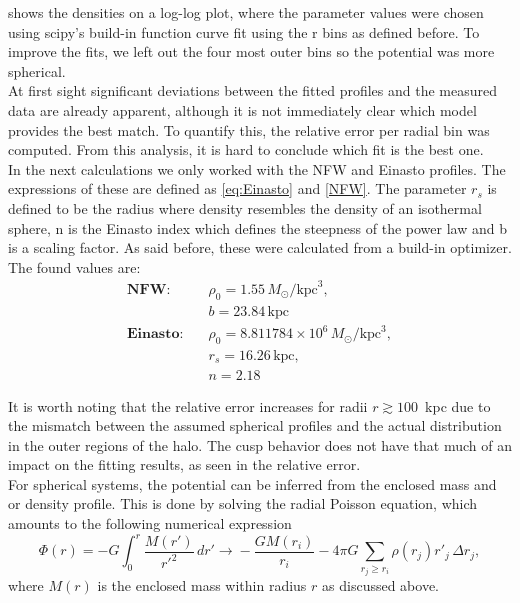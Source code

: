  shows the densities on a log-log plot, where the parameter values were chosen using scipy's build-in function curve fit using the r bins as defined before. To improve the fits, we left out the four most outer bins so the potential was more spherical. \\
At first sight significant deviations between the fitted profiles and the measured data are already apparent, although it is not immediately clear which model provides the best match. To quantify this, the relative error per radial bin was computed. From this analysis, it is hard to conclude which fit is the best one. \\
In the next calculations we only worked with the NFW and Einasto profiles. The expressions of these are defined as \cref{eq:Einasto} and \cref{NFW}. The parameter $r_s$ is defined to be the radius where density resembles the density of an isothermal sphere, n is the Einasto index which defines the steepness of the power law and b is a scaling factor. As said before, these were calculated from a build-in optimizer. The found values are:
\begin{align*}
    \textbf{NFW:} \quad & \rho_0 = 1.55\, M_{\odot}/\text{kpc}^3, \\[4pt]
    & b = 23.84\, \text{kpc} \\[10pt]
    \textbf{Einasto:} \quad & \rho_0 = 8.811784 \times 10^{6}\, M_{\odot}/\text{kpc}^3, \\[4pt]
    & r_s = 16.26\, \text{kpc}, \\[4pt]
    & n = 2.18
\end{align*}

It is worth noting that the relative error increases for radii $r \gtrsim 100$~kpc due to the mismatch between the assumed spherical profiles and the actual distribution in the outer regions of the halo. The cusp behavior does not have that much of an impact on the fitting results, as seen in the relative error. \\

For spherical systems, the potential can be inferred from the enclosed mass and or density profile. This is done by solving the radial Poisson equation, which amounts to the following numerical expression
\begin{equation}
    \Phi(r) = -G \int_0^r \frac{M(r')}{r'^2} \, dr' \xrightarrow{} -\frac{G M(r_i)}{r_i} - 4\pi G \sum_{r_j \geq r_i} \rho(r_j) r'_j \, \Delta r_j,
    \label{eq:potential_profile}
\end{equation}
where $M(r)$ is the enclosed mass within radius $r$ as discussed above.

